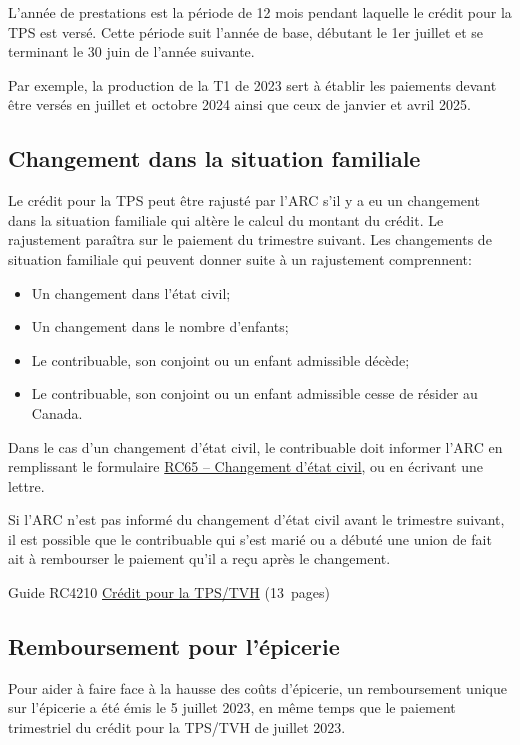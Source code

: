 L'année de prestations est la période de 12 mois pendant laquelle le crédit pour la TPS est versé. Cette période suit l'année de base, débutant le 1er juillet et se terminant le 30 juin de l'année suivante. 

Par exemple, la production de la T1 de 2023 sert à établir les paiements devant être versés en juillet et octobre 2024 ainsi que ceux de janvier et avril 2025.


\subsection{Changement dans la situation familiale}
Le crédit pour la TPS peut être rajusté par l'ARC s'il y a eu un changement dans la situation familiale qui altère le calcul du montant du crédit. Le rajustement paraîtra sur le paiement du trimestre suivant. Les changements de situation familiale qui peuvent donner suite à un rajustement comprennent:
\begin{itemize}
	\item Un changement dans l'état civil;
	\item Un changement dans le nombre d'enfants;
	\item Le contribuable, son conjoint ou un enfant admissible décède;
	\item Le contribuable, son conjoint ou un enfant admissible cesse de résider au Canada.
\end{itemize}

Dans le cas d'un changement d'état civil, le contribuable doit informer l'ARC en remplissant le formulaire \href{https://www.canada.ca/fr/agence-revenu/services/formulaires-publications/formulaires/rc65.html}{RC65 -- Changement d'état civil}, ou en écrivant une lettre.

\begin{note}
	Si l'ARC n'est pas informé du changement d'état civil avant le trimestre suivant, il est possible que le contribuable qui s'est marié ou a débuté une union de fait ait à rembourser le paiement qu'il a reçu après le changement. 
\end{note}

\cat
Guide RC4210 \href{https://www.canada.ca/fr/agence-revenu/services/formulaires-publications/publications/rc4210.html}{Crédit pour la TPS/TVH} (13~pages)

\subsection{Remboursement pour l'épicerie}
Pour aider à faire face à la hausse des coûts d'épicerie, un remboursement unique sur l'épicerie a été émis le 5 juillet 2023, en même temps que le paiement trimestriel du crédit pour la TPS/TVH de juillet 2023.

